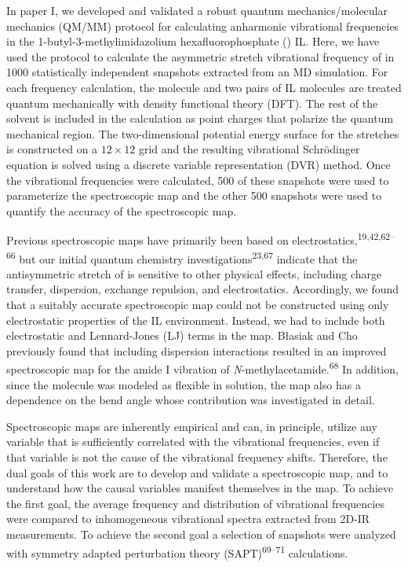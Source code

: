 \documentclass[]{article}
\begin{document}
In paper I, we developed and validated a robust quantum mechanics/molecular mechanics (QM/MM) protocol for calculating anharmonic  vibrational frequencies in the 1-butyl-3-methylimidazolium hexafluorophosphate (\ce{[C4C1im][PF6]}) IL. Here, we have used the protocol to calculate the asymmetric stretch vibrational frequency of  in 1000 statistically independent snapshots extracted from an MD simulation. For each frequency calculation, the  molecule and two pairs of IL molecules are treated quantum mechanically with density functional theory (DFT). The rest of the solvent is included in the calculation as point charges that polarize the quantum mechanical region. The two-dimensional potential energy surface for the  stretches is constructed on a \(12 \times 12\) grid and the resulting vibrational Schrödinger equation is solved using a discrete variable representation (DVR) method. Once the vibrational frequencies were calculated, \num{500} of these snapshots were used to parameterize the spectroscopic map and the other \num{500} snapshots were used to quantify the accuracy of the spectroscopic map.

Previous spectroscopic maps have primarily been based on electrostatics,\textsuperscript{19,42,62--66} but our initial quantum chemistry investigations\textsuperscript{23,67} indicate that the antisymmetric stretch of  is sensitive to other physical effects, including charge transfer, dispersion, exchange repulsion, and electrostatics. Accordingly, we found that a suitably accurate spectroscopic map could not be constructed using only electrostatic properties of the IL environment. Instead, we had to include both electrostatic and Lennard-Jones (LJ) terms in the map. Błasiak and Cho previously found that including dispersion interactions resulted in an improved spectroscopic map for the amide I vibration of \textit{N}-methylacetamide.\textsuperscript{68} In addition, since the  molecule was modeled as flexible in solution, the map also has a dependence on the  bend angle whose contribution was investigated in detail.

Spectroscopic maps are inherently empirical and can, in principle, utilize any variable that is sufficiently correlated with the vibrational frequencies, even if that variable is not the cause of the vibrational frequency shifts. Therefore, the dual goals of this work are to develop and validate a spectroscopic map, and to understand how the causal variables manifest themselves in the map. To achieve the first goal, the average frequency and distribution of vibrational frequencies were compared to inhomogeneous vibrational spectra extracted from 2D-IR measurements. To achieve the second goal a selection of snapshots were analyzed with symmetry adapted perturbation theory (SAPT)\textsuperscript{69--71} calculations.
\end{document}
